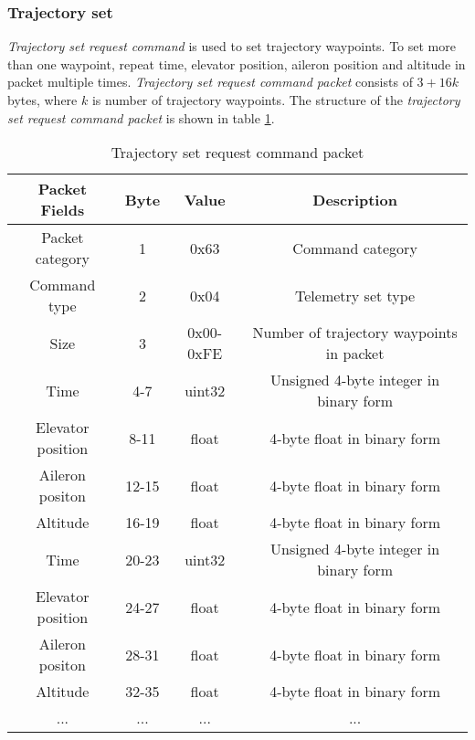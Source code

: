 \subsubsection{Trajectory set}
\label{sec:TrajectorySetCommand}
\textit{Trajectory set request command} is used to set trajectory waypoints. To set more than one waypoint, repeat time, elevator position, aileron position and altitude in packet multiple times. \textit{Trajectory set request command packet} consists of $3+16k$ bytes, where $k$ is number of trajectory waypoints.  The structure of the \textit{trajectory set request command packet} is shown in table \ref{tab:trajectorySetRequestCommandPacket}.
\begin{table}[H]
\begin{center}
\begin{tabular}{c c c c}
\toprule
\rowcolor[HTML]{FFFC9E} 
\textbf{Packet Fields} & \textbf{Byte} & \textbf{Value} & \textbf{Description}                     \\ \midrule
Packet category        & 1             & 0x63           & Command category                         \\ [1ex] 
Command type           & 2             & 0x04           & Telemetry set type                       \\ [1ex] 
Size                   & 3             & 0x00-0xFE      & Number of trajectory waypoints in packet \\ [1ex] 
Time                   & 4-7           & uint32         & Unsigned 4-byte integer in binary form    \\ [1ex] 
Elevator position      & 8-11          & float          & 4-byte float in binary form               \\ [1ex] 
Aileron positon        & 12-15         & float          & 4-byte float in binary form               \\ [1ex] 
Altitude               & 16-19         & float          & 4-byte float in binary form               \\ [1ex] 
Time                   & 20-23         & uint32         & Unsigned 4-byte integer in binary form    \\ [1ex] 
Elevator position      & 24-27         & float          & 4-byte float in binary form               \\ [1ex] 
Aileron positon        & 28-31         & float          & 4-byte float in binary form               \\ [1ex] 
Altitude               & 32-35         & float          & 4-byte float in binary form               \\ [1ex] 
...                    & ...           & ...            & ...      
\\  [1ex]  \bottomrule                               
\end{tabular}
\end{center}
\caption{Trajectory set request command packet}
\label{tab:trajectorySetRequestCommandPacket}
\end{table}


